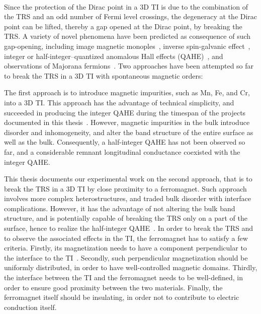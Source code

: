\paragraph{}
Since the protection of the Dirac point in a 3D TI is due to the combination of the TRS and an odd number of Fermi level crossings, the degeneracy at the Dirac point can be lifted, thereby a gap opened at the Dirac point, by breaking the TRS. A variety of novel phenomena have been predicted as consequence of such gap-opening, including image magnetic monoples~\cite{TI_birth, TI_monopole}, inverse spin-galvanic effect~\cite{ISG}, integer or half-integer--quantized anomalous Hall effects (QAHE)~\cite{TI_Col, QAH_TI_Yu}, and observations of Majorana fermions~\cite{TI_Qi, TI_Col}. Two approaches have been attempted so far to break the TRS in a 3D TI with spontaneous magnetic orders:

The first approach is to introduce magnetic impurities, such as Mn, Fe, and Cr, into a 3D TI. This approach has the advantage of technical simplicity, and succeeded in producing the integer QAHE during the timespan of the projects documented in this thesis~\cite{Chang2013, Kou2014}. However, magnetic impurities in the bulk introduce disorder and inhomogeneity, and alter the band structure of the entire surface as well as the bulk. Consequently, a half-integer QAHE has not been observed so far, and a considerable remnant longitudinal conductance coexisted with the integer QAHE.

This thesis documents our experimental work on the second approach, that is to break the TRS in a 3D TI by close proximity to a ferromagnet. Such approach involves more complex heterostructures, and traded bulk disorder with interface complications. However, it has the advantage of not altering the bulk band structure, and is potentially capable of breaking the TRS only on a part of the surface, hence to realize the half-integer QAHE~\cite{TI_Col}. In order to break the TRS and to observe the associated effects in the TI, the ferromagnet has to satisfy a few criteria. Firstly, its magnetization needs to have a component perpendicular to the interface to the TI~\cite{MnSe}. Secondly, such perpendicular magnetization should be uniformly distributed, in order to have well-controlled magnetic domains. Thirdly, the interface between the TI and the ferromagnet needs to be well-defined, in order to ensure good proximity between the two materials. Finally, the ferromagnet itself should be insulating, in order not to contribute to electric conduction itself.

